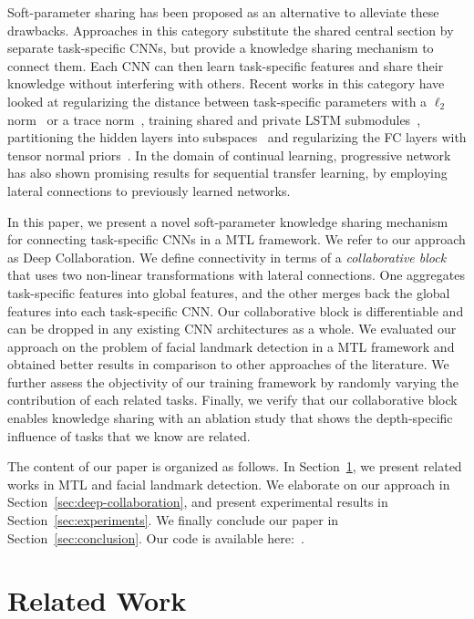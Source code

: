 \documentclass[runningheads]{llncs}
\newcommand{\citep}{\cite}
\begin{document}
Soft-parameter sharing has been proposed as an alternative to alleviate these drawbacks. Approaches in this category substitute the shared central section by separate task-specific CNNs, but provide a knowledge sharing mechanism to connect them. Each CNN can then learn task-specific features and share their knowledge without interfering with others. Recent works in this category have looked at regularizing the distance between task-specific parameters with a $\ell_2$ norm~\citep{duong2015low} or a trace norm~\citep{yang2016trace}, training shared and private LSTM submodules~\citep{liu2017adversarial}, partitioning the hidden layers into subspaces~\citep{ruder2017sluice} and regularizing the FC layers with tensor normal priors~\citep{long2015learning}. In the domain of continual learning, progressive network~\citep{rusu2016progressive} has also shown promising results for sequential transfer learning, by employing lateral connections to previously learned networks.

In this paper, we present a novel soft-parameter knowledge sharing mechanism for connecting task-specific CNNs in a MTL framework. We refer to our approach as Deep Collaboration. We define connectivity in terms of a \textit{collaborative block} that uses two non-linear transformations with lateral connections. One aggregates task-specific features into global features, and the other merges back the global features into each task-specific CNN. Our collaborative block is differentiable and can be dropped in any existing CNN architectures as a whole. We evaluated our approach on the problem of facial landmark detection in a MTL framework and obtained better results in comparison to other approaches of the literature. We further assess the objectivity of our training framework by randomly varying the contribution of each related tasks. Finally, we verify that our collaborative block enables knowledge sharing with an ablation study that shows the depth-specific influence of tasks that we know are related.


The content of our paper is organized as follows. In Section~\ref{sec:related-work}, we present related works in MTL and facial landmark detection. We elaborate on our approach in Section~\ref{sec:deep-collaboration}, and present experimental results in Section~\ref{sec:experiments}. We finally conclude our paper in Section~\ref{sec:conclusion}. Our code is available here:~\citep{trottier2018DeepCollaborationGithub}. 


\section{Related Work}
\label{sec:related-work}
\end{document}
